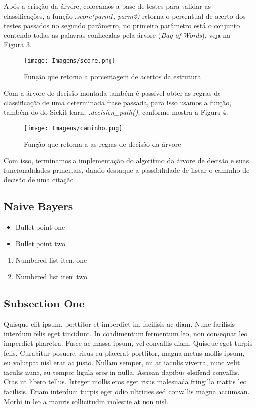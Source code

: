 \documentclass[preprint,12pt,times]{elsarticle}
\begin{document}
	Após a criação da árvore, colocamos a base de testes para validar as classificações, a função \textit{.score(parm1, parm2)} retorna o percentual de acerto dos testes passados no segundo parâmetro, no primeiro parâmetro está o conjunto contendo todas as palavras conhecidas pela árvore (\textit{Bag of Words}), veja na Figura 3.
	
	\begin{figure}[h]
	\centering\texttt{[image: Imagens/score.png]}
	\caption{Função que retorna a porcentagem de acertos da estrutura}
	\end{figure}

	Com a árvore de decisão montada também é possível obter as regras de classificação de uma determinada frase passada, para isso usamos a função, também do do Sickit-learn, \textit{.decision\_path()}, conforme mostra a Figura 4. 
	
	\begin{figure}[h]
	\centering\texttt{[image: Imagens/caminho.png]}
	\caption{Função que retorna a as regras de decisão da árvore}
	\end{figure}
	
	Com isso, terminamos a implementação do algoritmo da árvore de decisão e suas funcionalidades principais, dando destaque a possibilidade de listar o caminho de decisão de uma citação.
	
	\subsection{Naive Bayers}
	
		
	\begin{itemize}
		\item Bullet point one
		\item Bullet point two
	\end{itemize}

	\begin{enumerate}
		\item Numbered list item one
		\item Numbered list item two
	\end{enumerate}

	\subsection{Subsection One}

	Quisque elit ipsum, porttitor et imperdiet in, facilisis ac diam. Nunc facilisis interdum felis eget tincidunt. In condimentum fermentum leo, non consequat leo imperdiet pharetra. Fusce ac massa ipsum, vel convallis diam. Quisque eget turpis felis. Curabitur posuere, risus eu placerat porttitor, magna metus mollis ipsum, eu volutpat nisl erat ac justo. Nullam semper, mi at iaculis viverra, nunc velit iaculis nunc, eu tempor ligula eros in nulla. Aenean dapibus eleifend convallis. Cras ut libero tellus. Integer mollis eros eget risus malesuada fringilla mattis leo facilisis. Etiam interdum turpis eget odio ultricies sed convallis magna accumsan. Morbi in leo a mauris sollicitudin molestie at non nisl.
\end{document}
